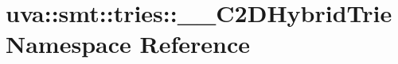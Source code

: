 \hypertarget{namespaceuva_1_1smt_1_1tries_1_1_____c2_d_hybrid_trie}{}\section{uva\+:\+:smt\+:\+:tries\+:\+:\+\_\+\+\_\+\+C2\+D\+Hybrid\+Trie Namespace Reference}
\label{namespaceuva_1_1smt_1_1tries_1_1_____c2_d_hybrid_trie}
